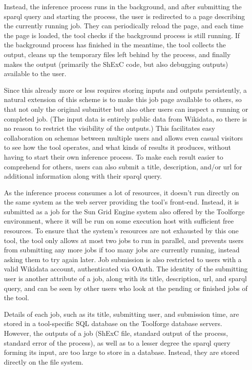 Instead, the inference process runs in the background,
and after submitting the \gls{sparql} query and starting the process,
the user is redirected to a page describing the currently running job.
They can periodically reload the page,
and each time the page is loaded,
the tool checks if the background process is still running.
If the background process has finished in the meantime,
the tool collects the output,
cleans up the temporary files left behind by the process,
and finally makes the output
(primarily the ShExC code, but also debugging outputs)
available to the user.

Since this already more or less requires storing inputs and outputs persistently,
a natural extension of this scheme is to make this job page available to others,
so that not only the original submitter but also other users can inspect a running or completed job.
(The input data is entirely public data from \gls{Wikidata},
so there is no reason to restrict the visibility of the outputs.)
This facilitates easy collaboration on \glspl{schema} between multiple users
and allows even casual visitors to see how the tool operates,
and what kinds of results it produces,
without having to start their own inference process.
To make each result easier to comprehend for others,
users can also submit a title, description, and/or \gls{url} for additional information
along with their \gls{sparql} query. %

As the inference process consumes a lot of resources,
it doesn’t run directly on the same system as the web server providing the tool’s front-end.
Instead, it is submitted as a job for the Sun Grid Engine system also offered by the Toolforge environment,
where it will be run on some execution host with sufficient free resources.
To ensure that the system’s resources are not exhausted by this one tool,
the tool only allows at most two jobs to run in parallel,
and prevents users from submitting any more jobs if too many jobs are currently running,
instead asking them to try again later.
Job submission is also restricted to users with a valid \gls{Wikidata} account,
authenticated via OAuth.
The identity of the submitting user is another attribute of a job,
along with its title, description, \gls{url}, and \gls{sparql} query,
and can be seen by other users who look at the pending or finished jobs of the tool.

Details of each job,
such as its title, submitting user, and submission time,
are stored in a tool-specific SQL database on the Toolforge database servers.
However, the outputs of a job
(ShExC file, standard output of the process, standard error of the process),
as well as to a lesser degree the \gls{sparql} query forming its input,
are too large to store in a database.
Instead, they are stored directly on the file system.

